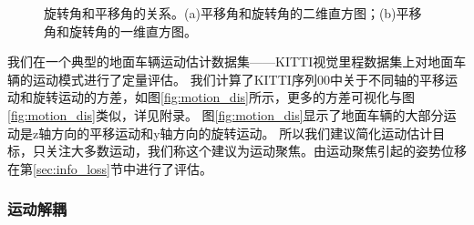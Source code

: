 \begin{figure}[h]
\begin{subfigure}[b]{0.65\textwidth}
        \caption{}
        \label{fig:rt_1d}
    \end{subfigure}
    \caption{旋转角和平移角的关系。(a)平移角和旋转角的二维直方图；(b)平移角和旋转角的一维直方图。}
    \label{fig:rotation_corr_analysis}
\end{figure}
我们在一个典型的地面车辆运动估计数据集——KITTI视觉里程数据集\cite{geiger2012kitti}上对地面车辆的运动模式进行了定量评估。
我们计算了KITTI序列00中关于不同轴的平移运动和旋转运动的方差，如图\ref{fig:motion_dis}所示，更多的方差可视化与图\ref{fig:motion_dis}类似，详见附录。
图\ref{fig:motion_dis}显示了地面车辆的大部分运动是z轴方向的平移运动和y轴方向的旋转运动。
所以我们建议简化运动估计目标，只关注大多数运动，我们称这个建议为运动聚焦。由运动聚焦引起的姿势位移在第\ref{sec:info_loss}节中进行了评估。

\subsubsection{运动解耦}
\label{sec:motion_decouple}

